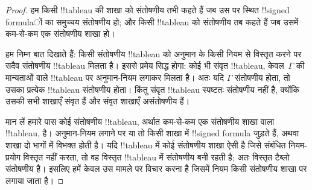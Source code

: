 \documentclass[../../../include/open-logic-section]{subfiles}
\begin{document}
\begin{proof}
हम किसी !!{tableau} की शाखा को संतोषणीय तभी कहते हैं जब उस पर स्थित
!!{signed formula}ों का समुच्चय संतोषणीय हो; और किसी !!{tableau} को संतोषणीय
तब कहते हैं जब उसमें कम-से-कम एक संतोषणीय शाखा हो।

हम निम्न बात दिखाते हैं: किसी संतोषणीय !!{tableau} को अनुमान के किसी नियम से
विस्तृत करने पर सदैव संतोषणीय !!{tableau} मिलता है। इससे प्रमेय सिद्ध होगा:
कोई भी संवृत !!{tableau}, केवल~$\Gamma$ की मान्यताओं वाले !!{tableau} पर
अनुमान-नियम लगाकर मिलता है। अतः यदि $\Gamma$ संतोषणीय होता, तो उसका प्रत्येक
!!{tableau} संतोषणीय होता। किंतु संवृत !!{tableau} स्पष्टतः संतोषणीय नहीं है,
क्योंकि उसकी सभी शाखाएँ संवृत हैं और संवृत शाखाएँ असंतोषणीय हैं।

मान लें हमारे पास कोई संतोषणीय !!{tableau}, अर्थात कम-से-कम एक संतोषणीय शाखा
वाला !!{tableau}, है। अनुमान-नियम लगाने पर या तो किसी शाखा में !!{signed formula} जुड़ते हैं, अथवा शाखा दो भागों में विभक्त होती है। यदि !!{tableau} में
कोई संतोषणीय शाखा ऐसी है जिसे संबंधित नियम-प्रयोग विस्तृत नहीं करता, तो वह
विस्तृत !!{tableau} में संतोषणीय बनी रहती है; अतः विस्तृत टैब्लो संतोषणीय है।
इसलिए हमें केवल उस मामले पर विचार करना है जिसमें नियम किसी संतोषणीय शाखा पर
लगाया जाता है।


\end{proof}
\end{document}
